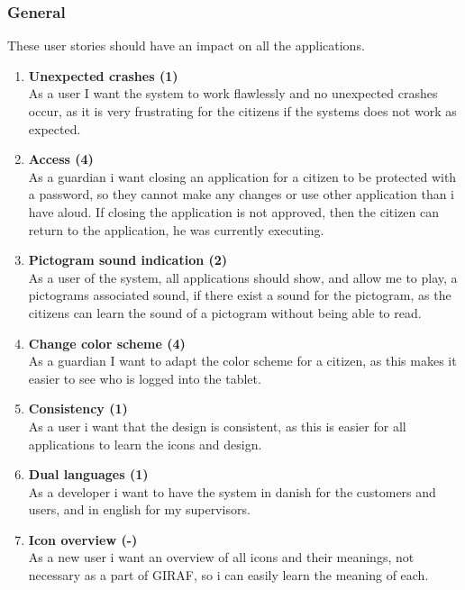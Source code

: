 \subsubsection{General}
These user stories should have an impact on all the applications.

\begin{enumerate}
	\item \textbf{Unexpected crashes (1)}\\
	As a user I want the system to work flawlessly and no unexpected crashes occur, as it is very frustrating for the citizens if the systems does not work as expected. 
	
	\item \textbf{Access (4)} \\
	As a guardian i want closing an application for a citizen to be protected with a password, so they cannot make any changes or use other application than i have aloud. If closing the application is not approved, then the citizen can return to the application, he was currently executing.
	
	\item \textbf{Pictogram sound indication (2)}\\
	As a user of the system, all applications should show, and allow me to play, a pictograms associated sound, if there exist a sound for the pictogram, as the citizens can learn the sound of a pictogram without being able to read. 
	
	\item \textbf{Change color scheme (4)}\\
	As a guardian I want to adapt the color scheme for a citizen, as this makes it easier to see who is logged into the tablet. 
	
	\item \textbf{Consistency (1)}\\
	As a user i want that the design is consistent, as this is easier for all applications to learn the icons and design.  
	
	\item \textbf{Dual languages (1)}\\
	As a developer i want to have the system in danish for the customers and users, and in english for my supervisors. 
	
	\item \textbf{Icon overview (-)} \\
	As a new user i want an overview of all icons and their meanings, not necessary as a part of GIRAF, so i can easily learn the meaning of each.
	

\end{enumerate}
